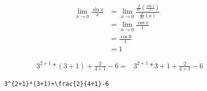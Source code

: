 \documentclass[12pt]{article}
\begin{document}
\begin{align*}
    \lim_{x \to 0}
    \frac{\sin{x}}{x}
    & = \lim_{x \to 0}
    \frac
    {\frac{d}{dx}\left( \frac{\sin{x}}{x} \right)}
    {\frac{d}{dx}\left( {x} \right)} \\
    & = \lim_{x \to 0}
    \frac{\cos{x}}{1} \\
    & = \frac{\cos{0}}{1} \\
    & = 1
\end{align*}


\begin{align*}
    &3^{2 + 1}*(3+1)+\frac{2}{4+1}-6 =

    &3^{2 + 1} * 3 + 1 + \frac{2}{4 + 1} - 6

\end{align*}
\begin{verbatim}
    3^{2+1}*(3+1)+\frac{2}{4+1}-6
\end{verbatim}
\end{document}
